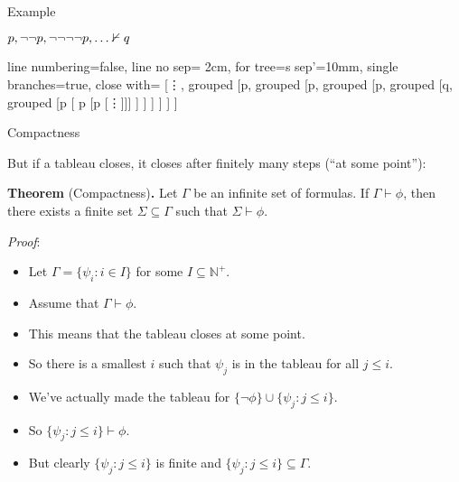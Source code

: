 \documentclass[../slides.tex]{subfiles}
\begin{document}
\begin{frame}{Example}

$p, \neg\neg p, \neg\neg \neg\neg p, \mathellipsis\nvdash q$

\begin{center}
				\begin{prooftree}
					{
					line numbering=false,
					line no sep= 2cm,
					for tree={s sep'=10mm},
					single branches=true,
					close with=\xmark
					}
					[\vdots, grouped [\neg\neg\neg\neg p, grouped [\neg\neg p, grouped [p, grouped [\neg q, grouped [p [ \neg \neg p [p [\vdots ]]] ] ] ]  ] ] ]
					\end{prooftree}
				\end{center}


\end{frame}

\begin{frame}{Compactness}

But if a tableau closes, it closes after finitely many steps (``at some point''):

\textbf{Theorem} (Compactness)\textbf{.} Let $\Gamma$ be an infinite set of formulas. If $\Gamma\vdash\phi$, then there exists a finite set $\Sigma\subseteq\Gamma$ such that $\Sigma\vdash\phi$. 

\emph{Proof}:

	\begin{itemize}
	
		\item Let $\Gamma=\{\psi_i: i\in I\}$ for some $I\subseteq\mathbb{N}^+$.
	
		\item Assume that $\Gamma\vdash\phi$. 
		
		\item This means that the tableau closes at some point.
		
		\item So there is a smallest $i$ such that $\psi_j$ is in the tableau for all $j\leq i$.
		
		\item We've actually made the tableau for $\{\neg\phi\}\cup\{\psi_j: j\leq i\}$.
		
		\item So $\{\psi_j: j\leq i\}\vdash\phi$.
		
		\item But clearly $\{\psi_j: j\leq i\}$ is finite and $\{\psi_j: j\leq i\}\subseteq\Gamma$.
	
	\end{itemize}


\end{frame}
\end{document}
